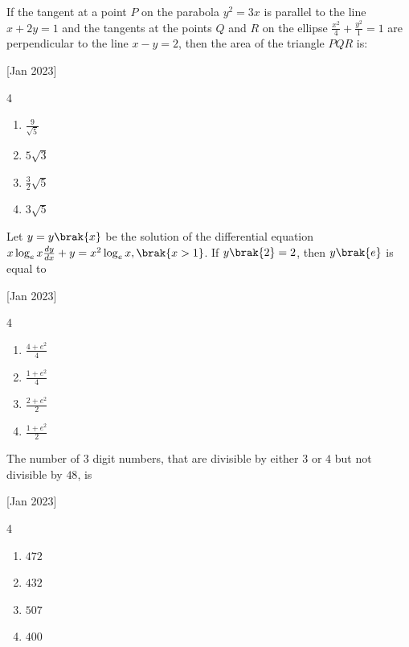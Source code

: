  
    \item If the tangent at a point $P$ on the parabola $y^2 = 3x$ is parallel to the line $x+2y=1$ and the tangents at the points $Q$ and $R$ on the ellipse $\frac{x^2}{4}+\frac{y^2}{1}=1$ are perpendicular to the line $x-y=2$, then the area of the triangle $PQR$ is:
    
    \hfill{[Jan 2023]}

        \begin{multicols}{4}
            \begin{enumerate}
                \item $\frac{9}{\sqrt{5}}$
                \item $5\sqrt{3}$
                \item $\frac{3}{2}\sqrt{5}$
                \item $3\sqrt{5}$
            \end{enumerate}
        \end{multicols}

    \item Let $y=y\brak{x}$ be the solution of the differential equation $x\log_ex\frac{dy}{dx}+y=x^2\log_ex,\brak{x>1}$. If $y\brak{2}=2$, then $y\brak{e}$ is equal to
    
    \hfill{[Jan 2023]}

		\begin{multicols}{4}
			\begin{enumerate}
				\item $\frac{4+e^2}{4}$
				\item $\frac{1+e^2}{4}$
				\item $\frac{2+e^2}{2}$
				\item $\frac{1+e^2}{2}$
			\end{enumerate}
		\end{multicols}

    \item The number of $3$ digit numbers, that are divisible by either $3$ or $4$ but not divisible by $48$, is
    
    \hfill{[Jan 2023]}

        \begin{multicols}{4}
            \begin{enumerate}
                \item $472$
                \item $432$
                \item $507$
                \item $400$
            \end{enumerate}
        \end{multicols}

